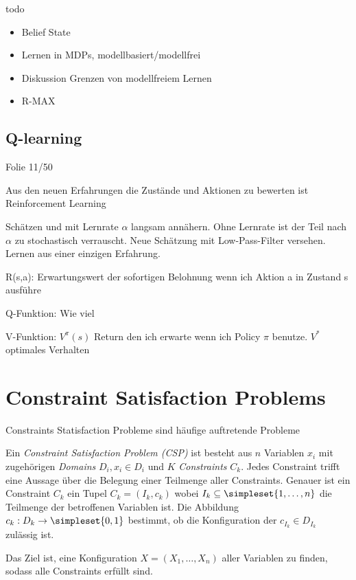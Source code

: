\documentclass[ngerman]{../LaTeX-Templates/Paper/paper}
\begin{document}
todo


\begin{itemize}
	\item Belief State
	\item Lernen in MDPs, modellbasiert/modellfrei
	\item Diskussion Grenzen von modellfreiem Lernen 
	\item R-MAX
\end{itemize}




\subsection{Q-learning} Folie 11/50



Aus den neuen Erfahrungen die Zustände und Aktionen zu bewerten ist Reinforcement Learning

Schätzen und mit Lernrate $\alpha$ langsam annähern. Ohne Lernrate ist der Teil nach $\alpha$ zu stochastisch verrauscht. Neue Schätzung mit Low-Pass-Filter versehen. Lernen aus einer einzigen Erfahrung.

R(s,a): Erwartungswert der sofortigen Belohnung wenn ich Aktion a in Zustand s ausführe

Q-Funktion: Wie viel 

V-Funktion: $V^\pi(s)$ Return den ich erwarte wenn ich Policy $\pi$ benutze. $V^\ast$ optimales Verhalten










\section{Constraint Satisfaction Problems}
Constraints Statisfaction Probleme sind häufige auftretende Probleme


\begin{definition}
	Ein \emph{Constraint Satisfaction Problem (CSP)} ist besteht aus $n$ Variablen $x_i$ mit zugehörigen \emph{Domains} $D_i, x_i\in D_i$ und $K$ \emph{Constraints} $C_k$.
	Jedes Constraint trifft eine Aussage über die Belegung einer Teilmenge aller Constraints. Genauer ist ein Constraint $C_k$ ein Tupel $C_k=(I_k,c_k)$ wobei $I_k\subseteq\simpleset{1,\ldots,n}$ die Teilmenge der betroffenen Variablen ist. Die Abbildung $c_k:D_k\rightarrow \simpleset{0,1}$ bestimmt, ob die Konfiguration der $c_{I_k}\in D_{I_k}$ zulässig ist.

	Das Ziel ist, eine Konfiguration $X=(X_1,\ldots,X_n)$ aller Variablen zu finden, sodass alle Constraints erfüllt sind.
\end{definition}
\end{document}
